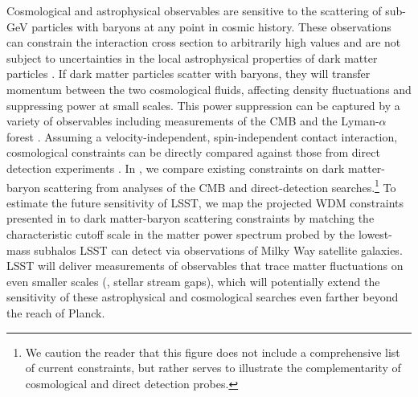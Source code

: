 
Cosmological and astrophysical observables are sensitive to the scattering of sub-GeV particles with baryons at any point in cosmic history. 
These observations can constrain the interaction cross section to arbitrarily high values and are not subject to uncertainties in the local astrophysical properties of dark matter particles \citep[\eg,][]{1210.2721,1404.1938}. 
If dark matter particles scatter with baryons, they will transfer momentum between the two cosmological fluids, affecting density fluctuations and suppressing power at small scales. 
This power suppression can be captured by a variety of observables including measurements of the CMB \citep{1311.2937,Gluscevic:2017ywp} and the Lyman-$\alpha$ forest \citep{Xu:2018efh}.
Assuming a velocity-independent, spin-independent contact interaction, cosmological constraints can be directly compared against those from direct detection experiments \citep[\eg,][]{Boddy:2018kfv}.
In , we compare existing constraints on dark matter-baryon scattering from analyses of the CMB and direct-detection searches.\footnote{We caution the reader that this figure does not include a comprehensive list of current constraints, but rather serves to illustrate the complementarity of cosmological and direct detection probes.} 
To estimate the future sensitivity of LSST, we map the projected WDM constraints presented in  to dark matter-baryon scattering constraints by matching the characteristic cutoff scale in the matter power spectrum probed by the lowest-mass subhalos LSST can detect via observations of Milky Way satellite galaxies. 
LSST will deliver measurements of observables that trace matter fluctuations on even smaller scales (\eg, stellar stream gaps), which will potentially extend the sensitivity of these astrophysical and cosmological searches even farther beyond the reach of Planck.
